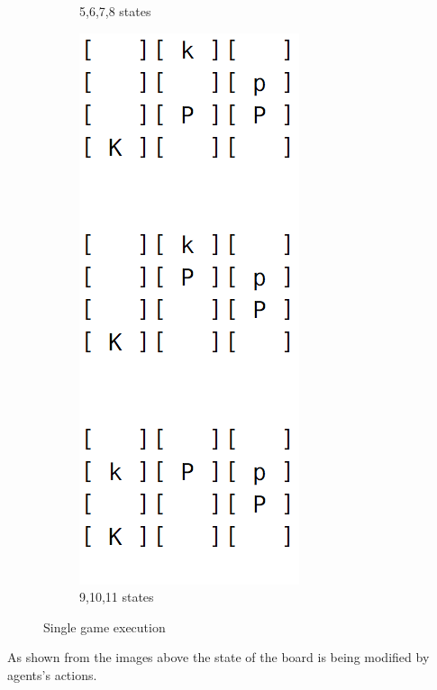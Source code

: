 \documentclass{article}
\begin{document}
\begin{figure}[h!]
\begin{subfigure}{0.23\textwidth}
                \caption{5,6,7,8 states}
        \end{subfigure}\qquad
        \begin{subfigure}{0.23\textwidth}
                \includegraphics[width=\linewidth]{visual_game_3}
                \caption{9,10,11 states}
        \end{subfigure}
        \caption{Single game execution}
 		\label{fig:6}
 		\end{figure}
				As shown from the images above the state of the board is being modified by agents's actions.\medskip\\
\end{document}
